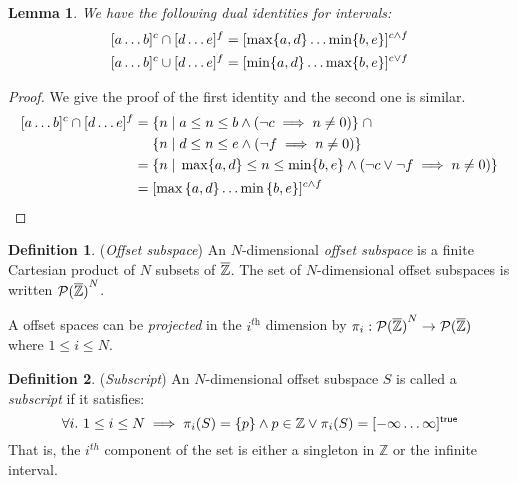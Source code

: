 \documentclass[acmlarge,review]{acmart}
\theoremstyle{definition}
\newtheorem{defn}{Definition}
\theoremstyle{plain}
\newtheorem{lem}{Lemma}
\theoremstyle{remark}
\begin{document}
\begin{lem}{}\label{lem:zinf-identities}
  We have the following dual identities for \zinf{} intervals:
%
  \begin{align*}
    \textnormal{$\lbrack a\dots b\rbrack^{c}$} \cap \textnormal{$\lbrack d\dots e\rbrack^{f}$} & =
      \textnormal{$\lbrack\max \{a,d\}\dots\min \{b,e\}\rbrack^{c \wedge f}$} \\
    \textnormal{$\lbrack a\dots b\rbrack^{c}$} \cup \textnormal{$\lbrack d\dots e\rbrack^{f}$} & =
      \textnormal{$\lbrack\min \{a,d\}\dots\max \{b,e\}\rbrack^{c \vee f}$}
  \end{align*}
\end{lem}
%
\begin{proof}
  We give the proof of the first identity and the second one is similar.
  \begin{align*}
    \textnormal{$\lbrack a\dots b\rbrack^{c}$} \cap \textnormal{$\lbrack d\dots e\rbrack^{f}$} = &
      \; \{ n \;|\; a \leq n \leq b \wedge (\neg c \implies n \neq 0) \}
      \;\cap \\
      & \; \{ n \;|\; d \leq n \leq e \wedge (\neg f \implies n \neq 0) \}
      \\
    = & \; \{ n \;|\; \max \{a,d\} \leq n \leq \min \{b,e\} \wedge (\neg c
      \vee \neg f \implies n \neq 0) \} \\
    = & \; \textnormal{$\lbrack\max{\{a,d\}}\dots\min{\{b,e\}}\rbrack^{c \wedge f}$}
  \end{align*}
\end{proof}

\begin{defn}{(\emph{Offset subspace})}
  An $N$-dimensional \emph{offset subspace} is a finite Cartesian product of $N$
  subsets of $\textnormal{$\overline{\mathbb{Z}}$}{}$. The set of $N$-dimensional offset subspaces is written
  ${\mathcal{P}(\textnormal{$\overline{\mathbb{Z}}$}{})}^N$.

  A offset spaces can be \emph{projected} in the $i^{\textit{th}}$ dimension by
  $\pi_i : {\mathcal{P}(\textnormal{$\overline{\mathbb{Z}}$}{})}^N \to \mathcal{P}(\textnormal{$\overline{\mathbb{Z}}$}{})$ where $1 \leq i
  \leq N$.
\end{defn}

\begin{defn}{(\emph{Subscript})}
  An $N$-dimensional offset subspace $S$ is called a \emph{subscript} if it
  satisfies:
%
  \begin{equation*}
    \forall i.\ 1 \leq i \leq N \implies
      \pi_i (S) = \{p\} \wedge p \in \mathbb{Z}
      \vee
      \pi_i (S) = \textnormal{$\lbrack-\infty\dots\infty\rbrack^{\mathsf{true}}$}
  \end{equation*}
  That is, the $i^{th}$ component of the set is either a singleton
  in $\mathbb{Z}$ or the infinite interval.

\end{defn}
\end{document}
